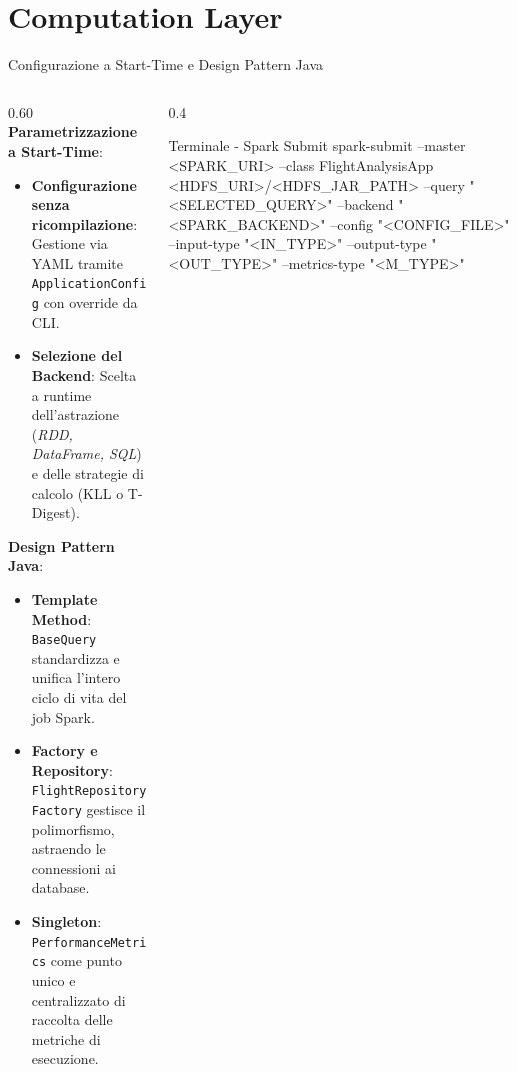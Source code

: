 \documentclass[10pt, aspectratio=169]{beamer}
\begin{document}
\section{Computation Layer}\label{sec:computation_layer}

\begin{frame}[fragile]{Configurazione a Start-Time e Design Pattern Java}

    \begin{columns}[c]

        \begin{column}{0.60\textwidth}
            \textbf{Parametrizzazione a Start-Time}:
                \begin{itemize}
                    \item \textbf{Configurazione senza ricompilazione}: Gestione via YAML tramite \texttt{ApplicationConfig} con override da CLI.
                    \item \textbf{Selezione del Backend}: Scelta a runtime dell'astrazione (\textit{RDD, DataFrame, SQL}) e delle strategie di calcolo (KLL o T-Digest).
                \end{itemize}
            \textbf{Design Pattern Java}:
                \begin{itemize}
                    \item \textbf{Template Method}: \texttt{BaseQuery} standardizza e unifica l'intero ciclo di vita del job Spark.
                    \item \textbf{Factory e Repository}: \texttt{FlightRepositoryFactory} gestisce il polimorfismo, astraendo le connessioni ai database.
                    \item \textbf{Singleton}: \texttt{PerformanceMetrics} come punto unico e centralizzato di raccolta delle metriche di esecuzione.
                \end{itemize}
        \end{column}

        \begin{column}{0.4\textwidth}
            \begin{terminalbox}{Terminale - Spark Submit}
spark-submit
    --master <SPARK_URI>
    --class FlightAnalysisApp
    <HDFS_URI>/<HDFS_JAR_PATH>
    --query "<SELECTED_QUERY>"
    --backend "<SPARK_BACKEND>"
    --config "<CONFIG_FILE>"
    --input-type "<IN_TYPE>"
    --output-type "<OUT_TYPE>"
    --metrics-type "<M_TYPE>"
            \end{terminalbox}
        \end{column}

    \end{columns}

\end{frame}
\end{document}
